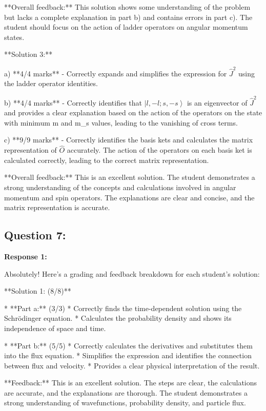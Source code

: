 \documentclass[a4paper,11pt]{article}
\begin{document}
**Overall feedback:** This solution shows some understanding of the problem but lacks a complete explanation in part b) and contains errors in part c). The student should focus on the action of ladder operators on angular momentum states.

**Solution 3:**

a) **4/4 marks** - Correctly expands and simplifies the expression for \(\hat{J}^2\) using the ladder operator identities.

b) **4/4 marks** - Correctly identifies that \(\left|l, -l; s, -s \right>\) is an eigenvector of \(\hat{J}^2\) and provides a clear explanation based on the action of the operators on the state with minimum m and m_s values, leading to the vanishing of cross terms.

c) **9/9 marks** - Correctly identifies the basis kets and calculates the matrix representation of \(\hat{O}\) accurately. The action of the operators on each basis ket is calculated correctly, leading to the correct matrix representation.

**Overall feedback:** This is an excellent solution. The student demonstrates a strong understanding of the concepts and calculations involved in angular momentum and spin operators. The explanations are clear and concise, and the matrix representation is accurate.



\subsection*{Question 7:}

\textbf{Response 1:}

Absolutely! Here's a grading and feedback breakdown for each student's solution:

**Solution 1: (8/8)**

*   **Part a:** (3/3) 
    *   Correctly finds the time-dependent solution using the Schrödinger equation.
    *   Calculates the probability density and shows its independence of space and time.

*   **Part b:** (5/5)
    *   Correctly calculates the derivatives and substitutes them into the flux equation.
    *   Simplifies the expression and identifies the connection between flux and velocity.
    *   Provides a clear physical interpretation of the result.

**Feedback:** This is an excellent solution. The steps are clear, the calculations are accurate, and the explanations are thorough. The student demonstrates a strong understanding of wavefunctions, probability density, and particle flux.
\end{document}
